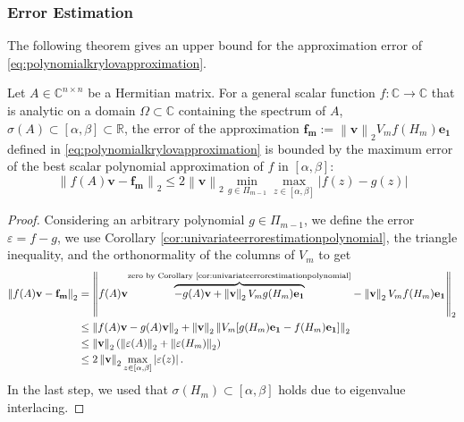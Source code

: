 \subsubsection{Error Estimation}
The following theorem gives an upper bound for the approximation error of
\eqref{eq:polynomialkrylovapproximation}.

\begin{theorem}
    \label{the:univariateerrorestimationgeneral}
    Let $A \in \mathbb{C}^{n \times n}$ be a Hermitian matrix. For a general scalar
    function $f: \mathbb{C} \to \mathbb{C}$ that is analytic on a domain
    $\Omega \subset \mathbb{C}$ containing the spectrum of $A$,
    $\sigma(A) \subset [\alpha, \beta] \subset \mathbb{R}$, the error of the approximation
    $\mathbf{f_m} := \left\| \mathbf{v} \right\|_{2} V_m f(H_m) \mathbf{e_1}$ defined in
    \eqref{eq:polynomialkrylovapproximation} is bounded by the maximum error of the best
    scalar polynomial approximation of $f$ in $[\alpha, \beta]$:
    \begin{equation}
        \label{eq:univariateerrorestimationgeneral}
        \left\| f(A)\mathbf{v} - \mathbf{f_m} \right\|_2 \le
        2 \left\| \mathbf{v} \right\|_2 \min_{g \in \Pi_{m-1}}
        \max_{z \in [\alpha, \beta]} \left|f(z) - g(z) \right|
    \end{equation}
\end{theorem}
\begin{proof}
    Considering an arbitrary polynomial $g \in \Pi_{m-1}$, we define the error
    $\varepsilon = f - g$, we use Corollary \ref{cor:univariateerrorestimationpolynomial},
    the triangle inequality, and the orthonormality of the columns of $V_m$ to get
    \begin{equation*}
        \begin{aligned}
            \left\| f(A)\mathbf{v} - \mathbf{f_m} \right\|_2
                & = \left\| f(A)\mathbf{v} \overset{\text{zero by Corollary \ref{cor:univariateerrorestimationpolynomial}}}
                {\overbrace{- g(A)\mathbf{v} + \left\| \mathbf{v} \right\|_{2} V_m g(H_m) \mathbf{e_1}}}
                - \left\| \mathbf{v} \right\|_{2} V_m f(H_m) \mathbf{e_1} \right\|_2 \\
            & \le \left\| f(A)\mathbf{v} - g(A)\mathbf{v} \right\|_{2}
                + \left\| \mathbf{v} \right\|_{2}
                \left\| V_m [g(H_m) \mathbf{e_1} - f(H_m) \mathbf{e_1}] \right\|_2\\
            & \le \left\| \mathbf{v} \right\|_2 \left( \left\| \varepsilon(A) \right\|_2 + \left\| \varepsilon(H_m) \right\|_2 \right)\\
            & \le 2 \left\| \mathbf{v} \right\|_2 \max_{z \in [\alpha, \beta]} \left| \varepsilon(z) \right|.
            \end{aligned}
    \end{equation*}
    In the last step, we used that $\sigma(H_m) \subset [\alpha, \beta]$
    holds due to eigenvalue interlacing.
\end{proof}

